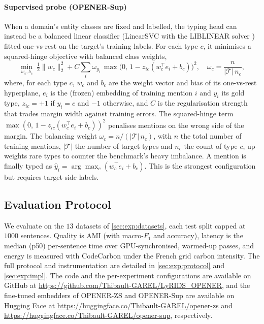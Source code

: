 \paragraph{Supervised probe (OPENER-Sup)}
When a domain's entity classes are fixed and labelled, the typing head can instead be a balanced linear classifier (LinearSVC with the LIBLINEAR solver \cite{fan2008liblinear}) fitted one-vs-rest on the target's training labels.
For each type $c$, it minimises a squared-hinge objective with balanced class weights,
\begin{equation}
\min_{w_c,b_c}\;\tfrac12\lVert w_c\rVert_2^2+C\sum_i \omega_{y_i}\,\max\!\big(0,\,1-z_{ic}(w_c^{\top} e_i+b_c)\big)^2,\quad \omega_c=\frac{n}{|\mathcal{T}|\,n_c},
\end{equation}
where, for each type $c$, $w_c$ and $b_c$ are the weight vector and bias of its one-vs-rest hyperplane, $e_i$ is the (frozen) embedding of training mention $i$ and $y_i$ its gold type, $z_{ic}{=}{+}1$ if $y_i{=}c$ and ${-}1$ otherwise, and $C$ is the regularisation strength that trades margin width against training errors. The squared-hinge term $\max(0,\,1-z_{ic}(w_c^{\top}e_i+b_c))^2$ penalises mentions on the wrong side of the margin. The balancing weight $\omega_c=n/(|\mathcal{T}|\,n_c)$, with $n$ the total number of training mentions, $|\mathcal{T}|$ the number of target types and $n_c$ the count of type $c$, up-weights rare types to counter the benchmark's heavy imbalance. A mention is finally typed as $\hat y_i=\arg\max_c (w_c^{\top}e_i+b_c)$.
This is the strongest configuration but requires target-side labels.

\subsection{Evaluation Protocol}
\label{sec:method:eval}
We evaluate on the $13$ datasets of \autoref{sec:exp:datasets}, each test split capped at $1000$ sentences.
Quality is AMI \cite{vinh2010ami} (with macro-$F_1$ and accuracy), latency is the median (p50) per-sentence time over GPU-synchronised, warmed-up passes, and energy is measured with CodeCarbon \cite{luccioni2019quantifying} under the French grid carbon intensity. The full protocol and instrumentation are detailed in \autoref{sec:exp:protocol} and \autoref{sec:exp:impl}.
The code and the per-experiment configurations are available on GitHub at \url{https://github.com/Thibault-GAREL/LyRIDS_OPENER}, and the fine-tuned embedders of OPENER-ZS and OPENER-Sup are available on Hugging Face at \url{https://huggingface.co/Thibault-GAREL/opener-zs} and \url{https://huggingface.co/Thibault-GAREL/opener-sup}, respectively.
